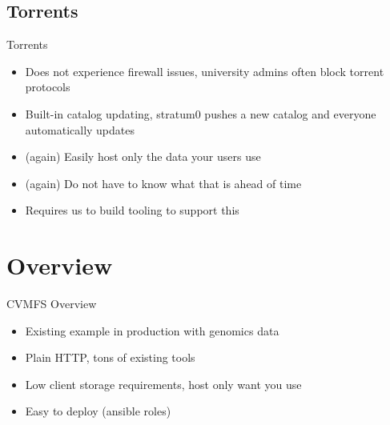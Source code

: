 \documentclass[12pt]{ufrslides}
\begin{document}
\subsection{Torrents}
\begin{frame}{Torrents}
	\begin{itemize}
		\item Does not experience firewall issues, university admins often block torrent protocols
		\item Built-in catalog updating, stratum0 pushes a new catalog and everyone automatically updates
		\item (again) Easily host only the data your users use
		\item (again) Do not have to know what that is ahead of time
		\item Requires us to build tooling to support this
	\end{itemize}
\end{frame}

\section{Overview}
\begin{frame}{CVMFS Overview}
	\begin{itemize}
		\item Existing example in production with genomics data
		\item Plain HTTP, tons of existing tools
		\item Low client storage requirements, host only want you use
		\item Easy to deploy (ansible roles)
	\end{itemize}
\end{frame}
\end{document}
